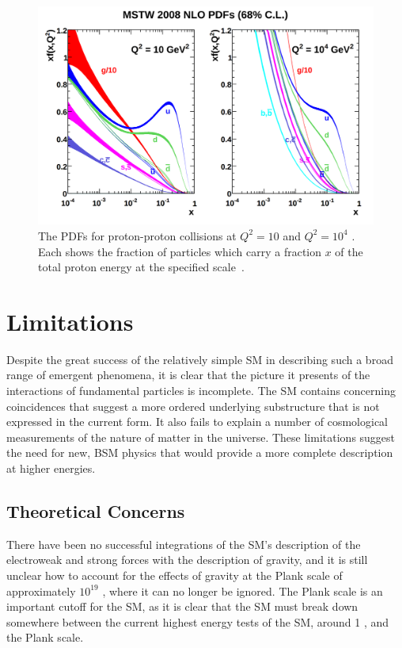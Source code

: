 \begin{figure}
\includegraphics[width=\fullfig]{figures/pdfs.png}
\caption{The \acp{PDF} for proton-proton collisions at $Q^2 = 10$ \GeV{} and $Q^2 = 10^4$ \GeV{}. Each shows the fraction of particles which carry a fraction $x$ of the total proton energy at the specified scale~\cite{pdfs}.}
\label{fig:pdfs}
\end{figure}


\section{Limitations}
\label{sec:limitations}

Despite the great success of the relatively simple \ac{SM} in describing such a broad range of emergent phenomena, it is clear that the picture it presents of the interactions of fundamental particles is incomplete.
The \ac{SM} contains concerning coincidences that suggest a more ordered underlying substructure that is not expressed in the current form.
It also fails to explain a number of cosmological measurements of the nature of matter in the universe.
These limitations suggest the need for new, \ac{BSM} physics that would provide a more complete description at higher energies.


\subsection{Theoretical Concerns}

There have been no successful integrations of the \ac{SM}'s description of the electroweak and strong forces with the description of gravity, and it is still unclear how to account for the effects of gravity at the Plank scale of approximately $10^{19}$ \GeV, where it can no longer be ignored. 
The Plank scale is an important cutoff for the \ac{SM}, as it is clear that the \ac{SM} must break down somewhere between the current highest energy tests of the \ac{SM}, around 1 \TeV, and the Plank scale.

